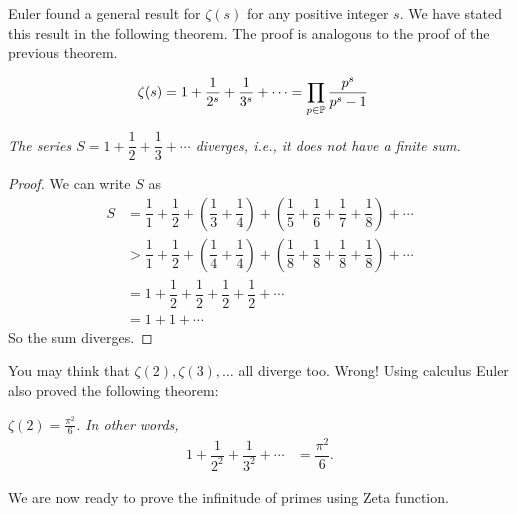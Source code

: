 \documentclass{subfiles}
\begin{document}
	Euler found a general result for $\zeta(s)$ for any positive integer $s$. We have stated this result in the following theorem. The proof is analogous to the proof of the previous theorem.
		\begin{theorem}\slshape
			\begin{align*}
				\zeta(s) & =1+\dfrac{1}{2^s}+\dfrac{1}{3^s}+\cdots=\prod_{p\in\P }\dfrac{p^s}{p^s-1}
			\end{align*}
		\end{theorem}
	
		\begin{theorem}\slshape
			The series $S=1+\dfrac{1}{2}+\dfrac{1}{3}+\cdots$ diverges, i.e., it does not have a finite sum.\label{thm:zeta1div}
		\end{theorem}
		
		\begin{proof}
			We can write $S$ as
				\begin{align*}
					S & =\dfrac11+ \dfrac12+ \left(\dfrac13+\dfrac14\right)+ \left(\dfrac15+\dfrac16+\dfrac17+\dfrac18\right)+\cdots\\
					  & > \dfrac11+\dfrac12+ \left(\dfrac14+\dfrac14\right) + \left(\dfrac18+\dfrac18+\dfrac18+\dfrac18\right)+\cdots\\
					  & =1+ \dfrac{1}{2}+ \dfrac{1}{2}+ \dfrac{1}{2}+ \dfrac{1}{2}+\cdots\\
					  & = 1+1+\cdots
				\end{align*}
			So the sum diverges.
		\end{proof}
	You may think that $\zeta(2),\zeta(3),\ldots$ all diverge too. Wrong! Using calculus Euler also proved the following theorem:
		\begin{theorem}\label{thm:zeta2}\slshape
			$\zeta(2)=\frac{\pi^2}{6}$. In other words,
				\begin{align*}
					1+\dfrac{1}{2^2}+\dfrac{1}{3^2}+\cdots & = \dfrac{\pi^2}{6}.
				\end{align*}
		\end{theorem}
	
	We are now ready to prove the infinitude of primes using Zeta function.
	
\end{document}
